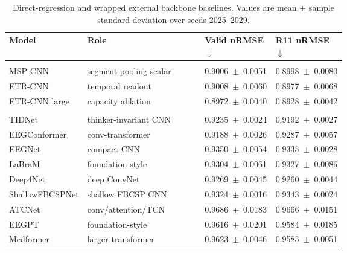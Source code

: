 \documentclass[12pt]{article}
\begin{document}
\begin{table}[!t]
\centering
\caption{Direct-regression and wrapped external backbone baselines. Values are mean $\pm$ sample standard deviation over seeds 2025--2029.}
\label{tab:r11_regression_baselines}
\footnotesize
\setlength{\tabcolsep}{2pt}
\renewcommand{\arraystretch}{1.15}
\begin{tabularx}{\linewidth}{@{} >{\RaggedRight\arraybackslash}p{0.22\linewidth} Y >{\centering\arraybackslash}p{0.215\linewidth} >{\centering\arraybackslash}p{0.215\linewidth} @{}}
\toprule
\textbf{Model} & \textbf{Role} & \textbf{Valid nRMSE} $\downarrow$ & \textbf{R11 nRMSE} $\downarrow$ \\
\midrule
{} \\
\addlinespace[0.15em]
MSP-CNN & segment-pooling scalar & \mbox{0.9006 $\pm$ 0.0051} & \mbox{0.8998 $\pm$ 0.0080} \\
ETR-CNN & temporal readout & \mbox{0.9008 $\pm$ 0.0060} & \mbox{0.8977 $\pm$ 0.0068} \\
ETR-CNN large & capacity ablation & \mbox{0.8972 $\pm$ 0.0040} & \mbox{0.8928 $\pm$ 0.0042} \\
\midrule
{} \\
\addlinespace[0.15em]
TIDNet & thinker-invariant CNN & \mbox{0.9235 $\pm$ 0.0024} & \mbox{0.9192 $\pm$ 0.0027} \\
EEGConformer & conv-transformer & \mbox{0.9188 $\pm$ 0.0026} & \mbox{0.9287 $\pm$ 0.0057} \\
EEGNet & compact CNN & \mbox{0.9350 $\pm$ 0.0054} & \mbox{0.9335 $\pm$ 0.0028} \\
LaBraM & foundation-style & \mbox{0.9304 $\pm$ 0.0061} & \mbox{0.9327 $\pm$ 0.0086} \\
Deep4Net & deep ConvNet & \mbox{0.9269 $\pm$ 0.0045} & \mbox{0.9260 $\pm$ 0.0044} \\
ShallowFBCSPNet & shallow FBCSP CNN & \mbox{0.9324 $\pm$ 0.0016} & \mbox{0.9343 $\pm$ 0.0024} \\
ATCNet & conv/attention/TCN & \mbox{0.9686 $\pm$ 0.0183} & \mbox{0.9666 $\pm$ 0.0151} \\
EEGPT & foundation-style & \mbox{0.9616 $\pm$ 0.0201} & \mbox{0.9584 $\pm$ 0.0185} \\
Medformer & larger transformer & \mbox{0.9623 $\pm$ 0.0046} & \mbox{0.9585 $\pm$ 0.0051} \\
\bottomrule
\end{tabularx}
\end{table}
\end{document}
